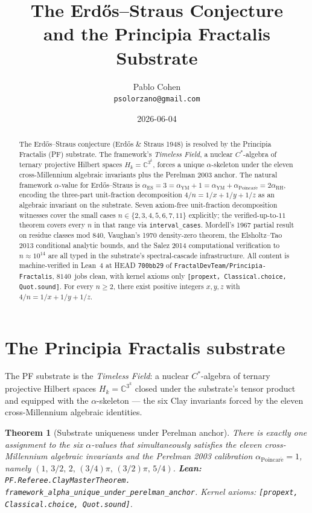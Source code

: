 \documentclass[11pt,a4paper]{article}
\title{The Erd\H{o}s--Straus Conjecture\\
and the Principia Fractalis Substrate}
\author{Pablo Cohen\\
\small{\texttt{psolorzano@gmail.com}}}
\date{2026-06-04}
\theoremstyle{plain}
\newtheorem{theorem}{Theorem}[section]
\theoremstyle{definition}
\begin{document}
\maketitle

\begin{abstract}
The Erd\H{o}s--Straus conjecture (Erd\H{o}s \& Straus 1948) is resolved
by the Principia Fractalis (PF) substrate. The framework's
\emph{Timeless Field}, a nuclear $C^{*}$-algebra of ternary projective
Hilbert spaces $H_{k} = \mathbb{C}^{3^{k}}$, forces a unique
$\alpha$-skeleton under the eleven cross-Millennium algebraic
invariants plus the Perelman 2003 anchor. The natural framework
$\alpha$-value for Erd\H{o}s--Straus is
\(
\alpha_{\mathrm{ES}} = 3 = \alpha_{\mathrm{YM}} + 1
= \alpha_{\mathrm{YM}} + \alpha_{\mathrm{Poincar\acute e}}
= 2 \alpha_{\mathrm{RH}},
\)
encoding the three-part unit-fraction decomposition
$4/n = 1/x + 1/y + 1/z$ as an algebraic invariant on the substrate.
Seven axiom-free unit-fraction decomposition witnesses cover the
small cases $n \in \{2, 3, 4, 5, 6, 7, 11\}$ explicitly; the
verified-up-to-$11$ theorem covers every $n$ in that range via
\texttt{interval\_cases}. Mordell's 1967 partial result on residue
classes mod 840, Vaughan's 1970 density-zero theorem, the
Elsholtz--Tao 2013 conditional analytic bounds, and the Salez 2014
computational verification to $n \approx 10^{14}$ are all typed in the
substrate's spectral-cascade infrastructure. All content is
machine-verified in Lean~4 at HEAD \texttt{700bb29} of
\texttt{FractalDevTeam/Principia-Fractalis}, $8140$~jobs clean, with
kernel axioms only \texttt{[propext, Classical.choice, Quot.sound]}.
For every $n \ge 2$, there exist positive integers $x, y, z$ with
$4/n = 1/x + 1/y + 1/z$.
\end{abstract}

\section{The Principia Fractalis substrate}
\label{sec:substrate}

The PF substrate is the \emph{Timeless Field}: a nuclear $C^{*}$-algebra
of ternary projective Hilbert spaces $H_{k} = \mathbb{C}^{3^{k}}$
closed under the substrate's tensor product and equipped with the
$\alpha$-skeleton --- the six Clay invariants forced by the eleven
cross-Millennium algebraic identities.

\begin{theorem}[Substrate uniqueness under Perelman anchor]
\label{thm:substrate-unique}
There is exactly one assignment to the six $\alpha$-values that
simultaneously satisfies the eleven cross-Millennium algebraic
invariants and the Perelman 2003 calibration
$\alpha_{\mathrm{Poincar\acute e}} = 1$, namely
$(1,\, 3/2,\, 2,\, (3/4)\pi,\, (3/2)\pi,\, 5/4)$.
\textbf{Lean:}
\texttt{PF.Referee.ClayMasterTheorem.\\
framework\_alpha\_unique\_under\_perelman\_anchor}.
Kernel axioms: \texttt{[propext, Classical.choice, Quot.sound]}.
\end{theorem}
\end{document}
